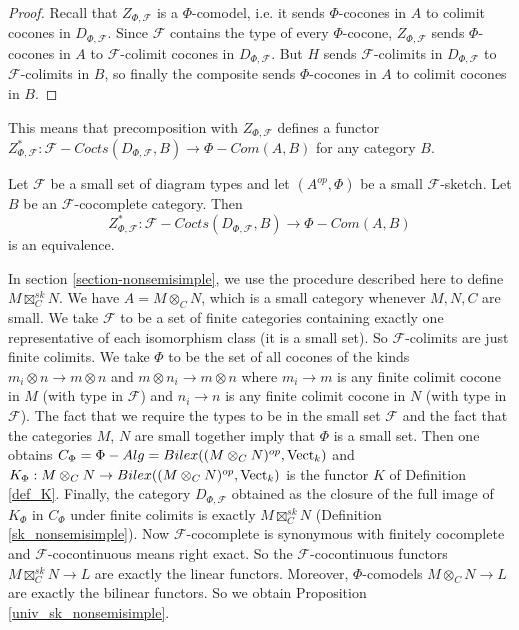  \begin{proof}
   Recall that $Z_{\Phi,\mathcal{F}}$ is a $\Phi$-comodel, i.e. it sends
   $\Phi$-cocones in $A$ to colimit cocones in $D_{\Phi,\mathcal{F}}$. Since
   $\mathcal{F}$ contains the type of every $\Phi$-cocone,
   $Z_{\Phi,\mathcal{F}}$ sends $\Phi$-cocones in $A$ to $\mathcal{F}$-colimit
   cocones in $D_{\Phi,\mathcal{F}}$. But $H$ sends $\mathcal{F}$-colimits in
   $D_{\Phi,\mathcal{F}}$ to $\mathcal{F}$-colimits in $B$, so finally the
   composite sends $\Phi$-cocones in $A$ to colimit cocones in $B$.
 \end{proof}

This means that precomposition with $Z_{\Phi,\mathcal{F}}$ defines a functor
$Z_{\Phi,\mathcal{F}}^*:\mathcal{F}-Cocts(D_{\Phi,\mathcal{F}},B)\to\Phi-Com(A,B)$
for any category $B$.

\begin{theorem}\cite[Theorem 6.23]{kelly/basic-concepts-enriched}\label{f_theory_small_sketch}

  \noindent Let $\mathcal{F}$ be a small set of diagram types and let
  $(A^{op},\Phi)$ be a small $\mathcal{F}$-sketch. Let $B$ be an
  $\mathcal{F}$-cocomplete category.
  Then $$Z_{\Phi,\mathcal{F}}^*:\mathcal{F}-Cocts(D_{\Phi,\mathcal{F}},B)\to\Phi-Com(A,B)$$
  is an equivalence.
\end{theorem}

In section \ref{section-nonsemisimple}, we use the procedure described here to
define $M\boxtimes_C^{sk}N$. We have $A=M\otimes_C N$, which is a small
category whenever $M,N,C$ are small. We take $\mathcal{F}$ to be a set of
finite categories containing exactly one representative of each isomorphism
class (it is a small set). So $\mathcal{F}$-colimits are just finite colimits.
We take $\Phi$ to be the set of all cocones of the kinds $m_i\otimes n\to
m\otimes n$ and $m\otimes n_i\to m\otimes n$ where $m_i\to m$ is any finite
colimit cocone in $M$ (with type in $\mathcal{F}$) and $n_i\to n$ is any
finite colimit cocone in $N$ (with type in $\mathcal{F}$). The fact that we
require the types to be in the small set $\mathcal{F}$ and the fact that the
categories $M$, $N$ are small together imply that $\Phi$ is a small set. Then
one obtains $C_{\Phi}=\Phi-Alg=Bilex((M\otimes_C N)^{op},\operatorname{Vect}_k)$ and
$K_{\Phi}:M\otimes_C N\to Bilex((M\otimes_C N)^{op},\operatorname{Vect}_k)$ is the functor
$K$ of Definition \ref{def_K}. Finally, the category $D_{\Phi,\mathcal{F}}$
obtained as the closure of the full image of $K_{\Phi}$ in $C_{\Phi}$ under
finite colimits is exactly $M\boxtimes_C^{sk}N$ (Definition
\ref{sk_nonsemisimple}). Now $\mathcal{F}$-cocomplete is synonymous with
finitely cocomplete and $\mathcal{F}$-cocontinuous means right exact. So the
$\mathcal{F}$-cocontinuous functors $M\boxtimes_C^{sk}N\to L$ are exactly the
linear functors. Moreover, $\Phi$-comodels $M\otimes_C N\to L$ are exactly the
bilinear functors. So we obtain Proposition \ref{univ_sk_nonsemisimple}.

